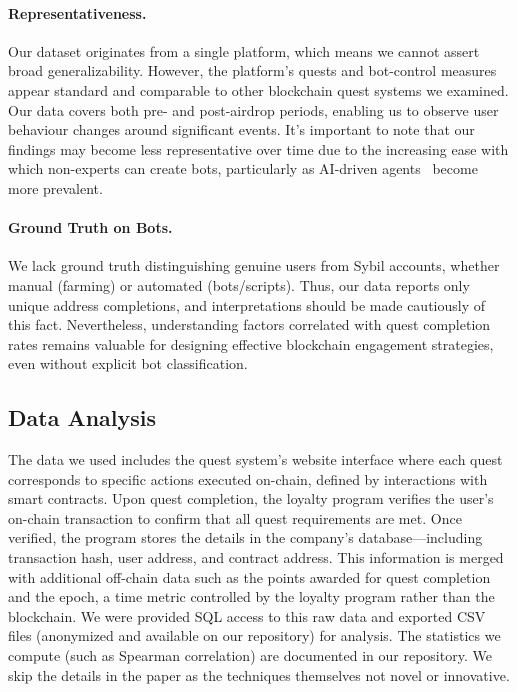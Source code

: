 \paragraph{Representativeness.} Our dataset originates from a single platform, which means we cannot assert broad generalizability. However, the platform's quests and bot-control measures appear standard and comparable to other blockchain quest systems we examined. Our data covers both pre- and post-airdrop periods, enabling us to observe user behaviour changes around significant events. It's important to note that our findings may become less representative over time due to the increasing ease with which non-experts can create bots, particularly as AI-driven agents~\cite{Ante24,WGN+25} become more prevalent.

\paragraph{Ground Truth on Bots.} We lack ground truth distinguishing genuine users from Sybil accounts, whether manual (farming) or automated (bots/scripts). Thus, our data reports only unique address completions, and interpretations should be made cautiously of this fact. Nevertheless, understanding factors correlated with quest completion rates remains valuable for designing effective blockchain engagement strategies, even without explicit bot classification.


\subsection{Data Analysis}

The data we used includes the quest system's website interface where each quest corresponds to specific actions executed on-chain, defined by interactions with smart contracts. Upon quest completion, the loyalty program verifies the user's on-chain transaction to confirm that all quest requirements are met. Once verified, the program stores the details in the company's database—including transaction hash, user address, and contract address. This information is merged with additional off-chain data such as the points awarded for quest completion and the epoch, a time metric controlled by the loyalty program rather than the blockchain. We were provided SQL access to this raw data and exported CSV files (anonymized and available on our repository) for analysis. The statistics we compute (such as Spearman correlation) are documented in our repository. We skip the details in the paper as the techniques themselves not novel or innovative. 

